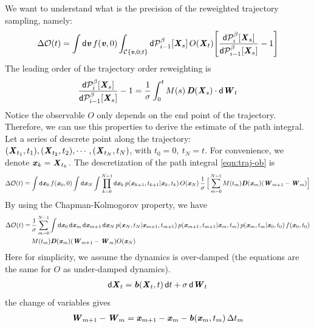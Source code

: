 \documentclass[aip,jcp,a4paper,reprint,onecolumn]{revtex4-1}
\newcommand{\vect}[1]{\textbf{\textit{#1}}}
\newcommand{\dd}{\textsf{d}}
\newcommand{\mo}{\mathcal O}
\newcommand{\mc}{\mathcal C}
\begin{document}
We want to understand what is the precision of the
reweighted trajectory sampling, namely:
\begin{align}\label{eqn:traj-ob}
  \Delta \mo (t) =
  \int \dd \vect v\, f(\vect v, 0)
  \int_{\mc\{\vect v, 0; t\}}
  \dd \mathcal P_{i-1}^\beta[\vect X_s]\,
  O(\vect X_t)
  \Bigg[
  \frac{\dd \mathcal P^\beta_i[\vect X_s]}
  {\dd \mathcal P^\beta_{i-1}[\vect X_s]}
  -1
  \Bigg]
\end{align}
The leading order of the trajectory order reweighting is
\begin{align}\label{eqn:leading-rew}
  \frac{\dd \mathcal P^\beta_i[\vect X_s]}
  {\dd \mathcal P^\beta_{i-1}[\vect X_s]}
  -1
  =
  \frac1\sigma\int_0^t M(s)\,
  \vect D(\vect X_s)\cdot \dd\vect W_t
\end{align}
Notice the observable $O$ only depends on the end point
of the trajectory. Therefore, we can use this properties to derive the
estimate of the path integral.
Let a series of descrete point along the trajectory:
$(\vect X_{t_1}, t_1), (\vect X_{t_2}, t_2), \cdots, (\vect X_{t_N}, t_N)$,
with $t_0 = 0,\ t_N = t$. For convenience, we denote
$\vect x_k = \vect X_{t_k}$. The descretization of the path integral
\eqref{eqn:traj-ob} is 
\begin{align}
  \Delta\mo (t) =
  \int\dd \vect x_0\, f(\vect x_0, 0)
  \int \dd \vect x_N
  \int
  \prod_{k=0}^{N-1}
  \dd \vect x_k\,
  p(\vect x_{k+1},t_{k+1} | \vect x_{k},t_{k})\,
  O(\vect x_N)\,
  \frac1\sigma\,
  \Big[
  \sum_{m=0}^{N-1}
  M(t_m) \vect D(\vect x_m) (\vect W_{m+1} - \vect W_{m})
  \Big]
\end{align}
By using the Chapman-Kolmogorov property, we have
\begin{align}\nonumber
  \Delta\mo (t) = &\,
  \frac1\sigma
  \sum_{m=0}^{N-1}
  \int \dd \vect x_0\,
  \dd \vect x_m\,
  \dd \vect x_{m+1}\,
  \dd \vect x_N\,
  p(\vect x_N,t_N | \vect x_{m+1}, t_{m+1})\,
  p(\vect x_{m+1}, t_{m+1} | \vect x_{m}, t_{m})\,
  p(\vect x_{m}, t_{m} | \vect x_{0}, t_{0}) \,
  f(\vect x_0, t_0)\\
  &\,
  M(t_m) \vect D(\vect x_m) (\vect W_{m+1} - \vect W_{m})  
  O(\vect x_N)
\end{align}
Here for simplicity, we assume the dynamics is over-damped (the equations
are the same for $O$ as under-damped dynamics).
\begin{align}
  \dd \vect X_t =
  \vect b(\vect X_t, t)\,\dd t +
  \sigma\, \dd \vect W_t
\end{align}
the change of variables gives
\begin{align}
  \vect W_{m+1} - \vect W_{m}
  =
  \vect x_{m+1} - \vect x_{m}
  -
  \vect b(\vect x_m, t_m)\,\Delta t_m
\end{align}
\end{document}
